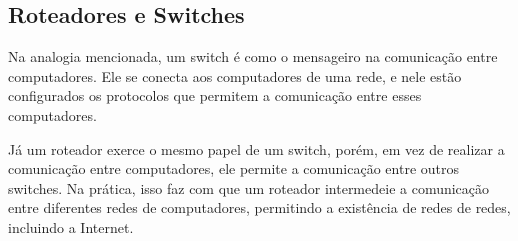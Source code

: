 \subsection{Roteadores e Switches}
\label{ch:roteadores e switches}

Na analogia mencionada, um switch \cite{cisco:switch} é como o mensageiro na comunicação entre computadores. Ele se conecta aos computadores de uma rede, e nele estão configurados os protocolos que permitem a comunicação entre esses computadores.

Já um roteador exerce o mesmo papel de um switch, porém, em vez de realizar a comunicação entre computadores, ele permite a comunicação entre outros switches. Na prática, isso faz com que um roteador intermedeie a comunicação entre diferentes redes de computadores, permitindo a existência de redes de redes, incluindo a Internet.
